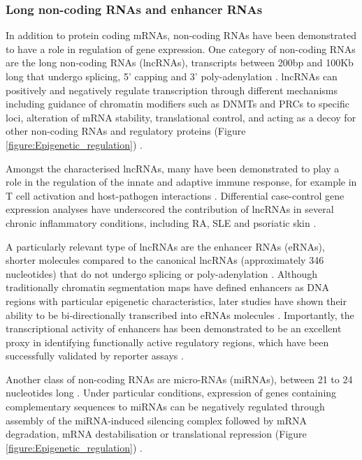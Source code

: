\subsubsection{Long non-coding RNAs and enhancer RNAs}
In addition to protein coding mRNAs, non-coding RNAs have been demonstrated to have a role in regulation of gene expression. One category of non-coding RNAs are the long non-coding RNAs (lncRNAs), transcripts between 200bp and 100Kb long that undergo splicing, 5' capping and 3' poly-adenylation \parencite{Derrien2012}. lncRNAs can positively and negatively regulate transcription through different mechanisms including guidance of chromatin modifiers such as DNMTs and PRCs to specific loci, alteration of mRNA stability, translational control, and acting as a decoy for other non-coding RNAs and regulatory proteins (Figure \ref{figure:Epigenetic_regulation}) \parencite{Pandey2008,Faghihi2008,Gong2011,Carrieri2012, Kino2010}.  %

Amongst the characterised lncRNAs, many have been demonstrated to play a role in the regulation of the innate and adaptive immune response, for example in T cell activation and host-pathogen interactions \parencite{Pang2009, Rossetto2012}. Differential case-control gene expression analyses have underscored the contribution of lncRNAs in several chronic inflammatory conditions, including RA, SLE and psoriatic skin \parencite{Muller2004,Shi2014,Li2014,Ahn2016}.

A particularly relevant type of lncRNAs are the enhancer RNAs (eRNAs), shorter molecules compared to the canonical lncRNAs (approximately 346 nucleotides) that do not undergo splicing or poly-adenylation \parencite{FANTOM2014}. Although traditionally chromatin segmentation maps have defined enhancers as DNA regions with particular epigenetic characteristics, later studies have shown their ability to be bi-directionally transcribed into eRNAs molecules \parencite{DeSanta2010, Kim2010}. Importantly, the transcriptional activity of enhancers has been demonstrated to be an excellent proxy in identifying functionally active regulatory regions, which have been successfully validated by reporter assays \parencite{FANTOM2014, Andersen2014}. 

Another class of non-coding RNAs are micro-RNAs (miRNAs), between 21 to 24 nucleotides long \parencite{Lee2002}. Under particular conditions, expression of genes containing complementary sequences to miRNAs can be negatively regulated through assembly of the miRNA-induced silencing complex followed by mRNA degradation, mRNA destabilisation or translational repression (Figure \ref{figure:Epigenetic_regulation}) \parencite{Ameres2010,Braun2011,Petersen2006,Lewis2005, Friedman2008}. 


